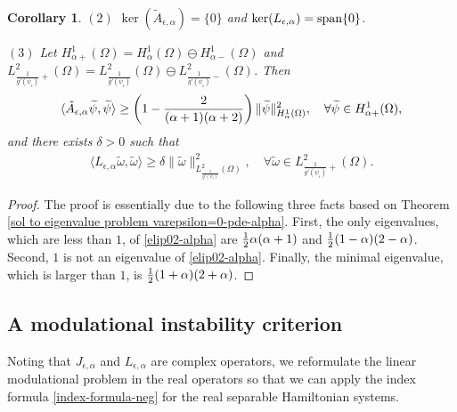 \documentclass[1 [leqno, 11pt]{amsart}
\numberwithin{equation}{section}
\let\ep=\epsilon
\newtheorem{Corollary}[Theorem]{Corollary}
\begin{document}
\begin{CJK*}{GBK}{song}
\begin{Corollary}
$(2)$ $\ker (\tilde A_{\ep,\alpha})=\{0\}$ and $\ker (L_{\ep,\alpha})=\textup{span}\{0\}$.

$(3)$ Let  $ H_{\alpha+}^1(\Omega)= H_{\alpha}^1(\Omega) \ominus H_{\alpha-}^1(\Omega)$ and $L^2_{\frac{1}{g'(\psi_\ep)}+}(\Omega)=L^2_{\frac{1}{g'(\psi_\ep)}}(\Omega) \ominus L^2_{\frac{1}{g'(\psi_\ep)}-}(\Omega)$. Then
\begin{align*}
\langle \tilde A_{\ep,\alpha} \widetilde\psi,\widetilde\psi\rangle \geq \left(1-{2\over (\alpha+1)(\alpha+2)}\right) \| \widetilde\psi\|_{H_{\alpha}^1(\Omega)}^2, \quad\forall \widetilde\psi\in H_{\alpha+}^1(\Omega),
\end{align*}
and there exists $\delta>0$ such that
\begin{align*}
\langle L_{\ep,\alpha} \widetilde\omega,\widetilde\omega\rangle \geq \delta \| \widetilde\omega\|_{L^2_{\frac{1}{g'(\psi_\ep)}}(\Omega)}^2, \quad \forall \widetilde\omega\in L^2_{\frac{1}{g'(\psi_\ep)}+}(\Omega).
\end{align*}
\end{Corollary}
\begin{proof}
The proof is essentially due to the following three facts based on Theorem \ref{sol to eigenvalue problem varepsilon=0-pde-alpha}. First, the only eigenvalues, which are less than $1$, of \eqref{elip02-alpha} are ${1\over 2}\alpha(\alpha+1)$ and ${1\over 2}(1-\alpha)(2-\alpha)$. Second, $1$ is not an eigenvalue of \eqref{elip02-alpha}.
Finally, the minimal eigenvalue, which is larger than $1$, is ${1\over2}(1+\alpha)(2+\alpha)$.
\end{proof}
\subsection{A modulational  instability criterion}
Noting that $J_{\ep, \alpha}$ and  $L_{\ep, \alpha}$ are complex operators, we reformulate the linear modulational  problem in the real operators so that we can apply the index formula \eqref{index-formula-neg} for
the real separable Hamiltonian systems.


\end{CJK*}
\end{document}
